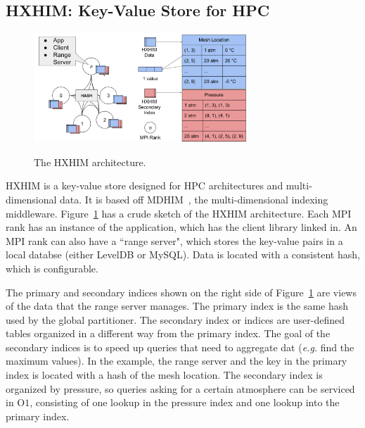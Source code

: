 \subsection{HXHIM: Key-Value Store for HPC}
\label{sec:hxhim}

\begin{figure}[tb]
  \noindent\includegraphics[width=19pc,angle=0]{figures/arch-hxhim.png}\\
  \caption{The HXHIM architecture.}
  \label{fig:arch-hxhim}
\end{figure}

HXHIM is a key-value store designed for HPC architectures and multi-dimensional
data. It is based off MDHIM~\cite{greenberg:hotstorage2015-mdhim}, the
multi-dimensional indexing middleware. Figure~\ref{fig:arch-hxhim} has a crude
sketch of the HXHIM architecture. Each MPI rank has an instance of the
application, which has the client library linked in. An MPI rank can also have
a ``range server", which stores the key-value pairs in a local databse (either
LevelDB or MySQL). Data is located with a consistent hash, which is
configurable.

The primary and secondary indices shown on the right side of
Figure~\ref{fig:arch-hxhim} are views of the data that the range server
manages.  The primary index is the same hash used by the global partitioner.
The secondary index or indices are user-defined tables organized in a different
way from the primary index. The goal of the secondary indices is to speed up
queries that need to aggregate dat ({\it e.g.} find the maximum values). In the
example, the range server and the key in the primary index is located with a
hash of the mesh location. The secondary index is organized by pressure, so
queries asking for a certain atmosphere can be serviced in O\(1\), consisting
of one lookup in the pressure index and one lookup into the primary index.

